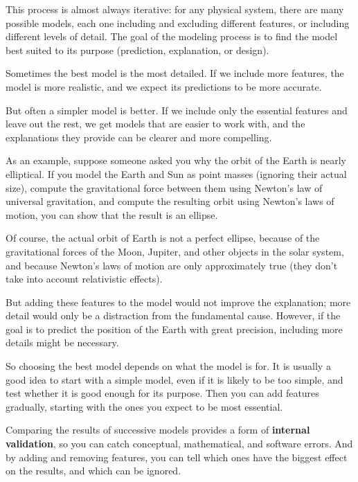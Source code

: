 \documentclass[12pt]{book}
\theoremstyle{exercise}
\begin{document}
This process is almost always iterative: for any physical system, there are many possible models, each one including and excluding different features, or including different levels of detail.  The goal of the modeling process is to find the model best suited to its purpose (prediction, explanation, or design).


Sometimes the best model is the most detailed.  If we include more features, the model is more realistic, and we expect its predictions to be more accurate.

But often a simpler model is better.  If we include only the essential features and leave out the rest, we get models that are easier to work with, and the explanations they provide can be clearer and more compelling.

As an example, suppose someone asked you why the orbit of the Earth is nearly elliptical.  If you model the Earth and Sun as point masses (ignoring their actual size), compute the gravitational force between them using Newton's law of universal gravitation, and compute the resulting orbit using Newton's laws of motion, you can show that the result is an ellipse.

Of course, the actual orbit of Earth is not a perfect ellipse, because of the gravitational forces of the Moon, Jupiter, and other objects in the solar system, and because Newton's laws of motion are only approximately true (they don't take into account relativistic effects).

But adding these features to the model would not improve the explanation; more detail would only be a distraction from the fundamental cause.  However, if the goal is to predict the position of the Earth with great precision, including more details might be necessary.  

So choosing the best model depends on what the model is for.  It is usually a good idea to start with a simple model, even if it is likely to be too simple, and test whether it is good enough for its purpose.  Then you can add features gradually, starting with the ones you expect to be most essential.

Comparing the results of successive models provides a form of {\bf internal validation}, so you can catch conceptual, mathematical, and software errors.  And by adding and removing features, you can tell which ones have the biggest effect on the results, and which can be ignored.
\end{document}
